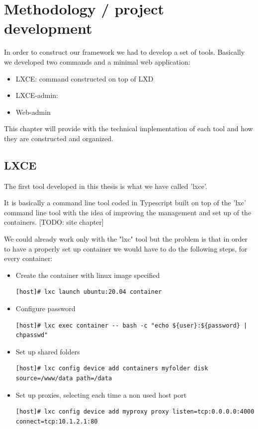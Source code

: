 \clearpage\section{Methodology / project development}

In order to construct our framework we had to develop a set of tools. Basically we developed two commands and a minimal web application:
\begin{itemize}
	\item{LXCE: command constructed on top of LXD}
	\item{LXCE-admin: }
	\item{Web-admin} 
\end{itemize}

This chapter will provide with the technical implementation of each tool and how they are constructed and organized. 

\subsection{LXCE}
The first tool developed in this thesis is what we have called 'lxce'.

It is basically a command line tool coded in Typescript built on top of the 'lxc' command line tool with the idea of improving the management and set up of the containers.
[TODO: site chapter]

We could already work only with the "lxc" tool but the problem is that in order to have a properly set up container we would have to do the following steps, for every container:
\begin{itemize}
	\item{Create the container with linux image specified}
		\begin{verbatim}
[host]# lxc launch ubuntu:20.04 container
		\end{verbatim}
	\item{Configure password}
		\begin{verbatim}
[host]# lxc exec container -- bash -c "echo ${user}:${password} | chpasswd"
		\end{verbatim}
	\item{Set up shared folders}
		\begin{verbatim}
[host]# lxc config device add containers myfolder disk source=/www/data path=/data
		\end{verbatim}
	\item{Set up proxies, selecting each time a non used host port}
		\begin{verbatim}
[host]# lxc config device add myproxy proxy listen=tcp:0.0.0.0:4000 connect=tcp:10.1.2.1:80
		\end{verbatim}
\end{itemize}

